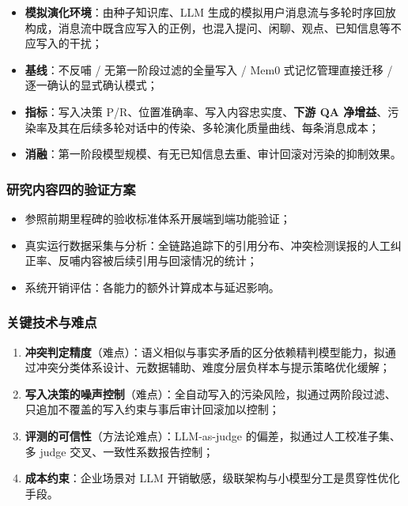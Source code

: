 \begin{itemize}
  \item \textbf{模拟演化环境}：由种子知识库、LLM 生成的模拟用户消息流与多轮时序回放构成，消息流中既含应写入的正例，也混入提问、闲聊、观点、已知信息等不应写入的干扰；
  \item \textbf{基线}：不反哺 / 无第一阶段过滤的全量写入 / Mem0 式记忆管理直接迁移 / 逐一确认的显式确认模式；
  \item \textbf{指标}：写入决策 P/R、位置准确率、写入内容忠实度、\textbf{下游 QA 净增益}、污染率及其在后续多轮对话中的传染、多轮演化质量曲线、每条消息成本；
  \item \textbf{消融}：第一阶段模型规模、有无已知信息去重、审计回滚对污染的抑制效果。
\end{itemize}

\subsubsection{研究内容四的验证方案}

\begin{itemize}
  \item 参照前期里程碑的验收标准体系开展端到端功能验证；
  \item 真实运行数据采集与分析：全链路追踪下的引用分布、冲突检测误报的人工纠正率、反哺内容被后续引用与回滚情况的统计；
  \item 系统开销评估：各能力的额外计算成本与延迟影响。
\end{itemize}

\subsubsection{关键技术与难点}

\begin{enumerate}
  \item \textbf{冲突判定精度}（难点）：语义相似与事实矛盾的区分依赖精判模型能力，拟通过冲突分类体系设计、元数据辅助、难度分层负样本与提示策略优化缓解；
  \item \textbf{写入决策的噪声控制}（难点）：全自动写入的污染风险，拟通过两阶段过滤、只追加不覆盖的写入约束与事后审计回滚加以控制；
  \item \textbf{评测的可信性}（方法论难点）：LLM-as-judge 的偏差，拟通过人工校准子集、多 judge 交叉、一致性系数报告控制；
  \item \textbf{成本约束}：企业场景对 LLM 开销敏感，级联架构与小模型分工是贯穿性优化手段。
\end{enumerate}


